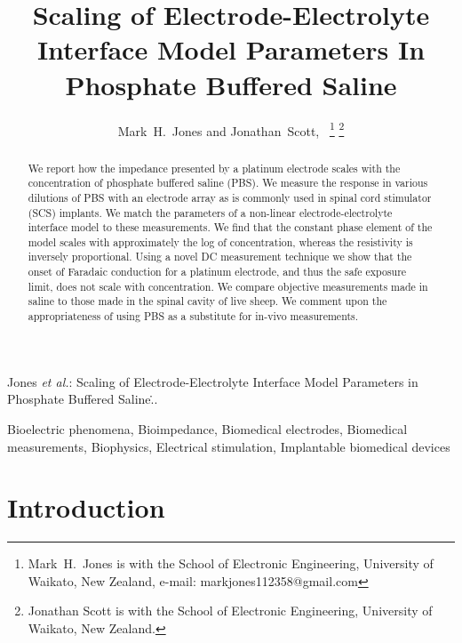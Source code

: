 \documentclass[journal, a4paper]{IEEEtran}
\begin{document}
\title{Scaling of Electrode-Electrolyte Interface Model Parameters In Phosphate Buffered Saline}

\author{Mark~H.~Jones and Jonathan~Scott,~
\thanks{Mark~H.~Jones is with the School of Electronic Engineering, University of Waikato, New Zealand, e-mail: markjones112358@gmail.com}%
\thanks{Jonathan Scott is with the School of Electronic Engineering, University of Waikato, New Zealand.}
}

{Jones \MakeLowercase{\textit{et al.}}: Scaling of Electrode-Electrolyte Interface Model Parameters in Phosphate Buffered Saline\...}
\maketitle



\begin{abstract}
We report how the impedance presented by a platinum electrode scales with the concentration of phosphate buffered saline (PBS).
We measure the response in various dilutions of PBS with an electrode array as is commonly used in spinal cord stimulator (SCS) implants. We match the parameters of a non-linear electrode-electrolyte interface model to these measurements.
We find that the constant phase element of the model scales with approximately the log of concentration, whereas the resistivity is inversely proportional.
Using a novel DC measurement technique we show that the onset of Faradaic conduction for a platinum electrode, and thus the safe exposure limit, does not scale with concentration.
We compare objective measurements made in saline to those made in the spinal cavity of live sheep. We comment upon the appropriateness of using PBS as a substitute for in-vivo measurements.
\end{abstract}

\begin{IEEEkeywords}
    Bioelectric phenomena, Bioimpedance, Biomedical electrodes, Biomedical measurements, Biophysics, Electrical stimulation, Implantable biomedical devices
\end{IEEEkeywords}




\section{Introduction}
\end{document}
